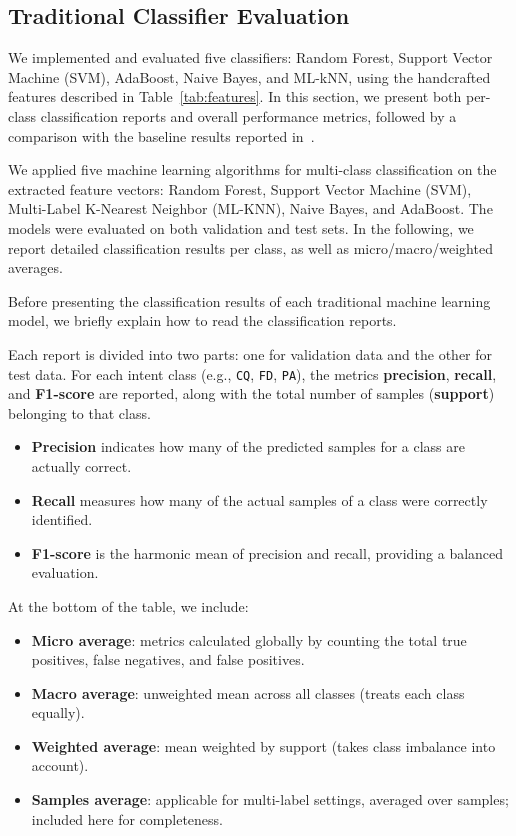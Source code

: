 \documentclass{article}
\begin{document}
\subsection{Traditional Classifier Evaluation}

We implemented and evaluated five classifiers: Random Forest, Support Vector Machine (SVM), AdaBoost, Naive Bayes, and ML-kNN, using the handcrafted features described in Table~\ref{tab:features}. In this section, we present both per-class classification reports and overall performance metrics, followed by a comparison with the baseline results reported in~\cite{qu2019user}.

We applied five machine learning algorithms for multi-class classification on the extracted feature vectors: Random Forest, Support Vector Machine (SVM), Multi-Label K-Nearest Neighbor (ML-KNN), Naive Bayes, and AdaBoost. The models were evaluated on both validation and test sets. In the following, we report detailed classification results per class, as well as micro/macro/weighted averages.

Before presenting the classification results of each traditional machine learning model, we briefly explain how to read the classification reports.

Each report is divided into two parts: one for validation data and the other for test data. For each intent class (e.g., \texttt{CQ}, \texttt{FD}, \texttt{PA}), the metrics \textbf{precision}, \textbf{recall}, and \textbf{F1-score} are reported, along with the total number of samples (\textbf{support}) belonging to that class.

\begin{itemize}
  \item \textbf{Precision} indicates how many of the predicted samples for a class are actually correct.
  \item \textbf{Recall} measures how many of the actual samples of a class were correctly identified.
  \item \textbf{F1-score} is the harmonic mean of precision and recall, providing a balanced evaluation.
\end{itemize}

At the bottom of the table, we include:
\begin{itemize}
  \item \textbf{Micro average}: metrics calculated globally by counting the total true positives, false negatives, and false positives.
  \item \textbf{Macro average}: unweighted mean across all classes (treats each class equally).
  \item \textbf{Weighted average}: mean weighted by support (takes class imbalance into account).
  \item \textbf{Samples average}: applicable for multi-label settings, averaged over samples; included here for completeness.
\end{itemize}
\end{document}
